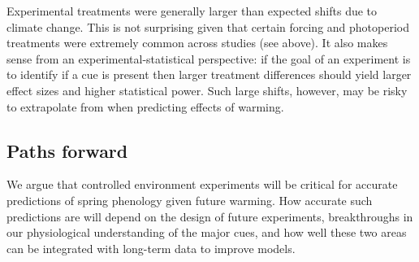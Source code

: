 \documentclass[11pt,letter]{article}
\begin{document}
Experimental treatments were generally larger than expected shifts due to climate change. This is not surprising given that certain forcing and photoperiod treatments were extremely common across studies (see above). It also makes sense from an experimental-statistical perspective: if the goal of an experiment is to identify if a cue is present then larger treatment differences should yield larger effect sizes and higher statistical power. Such large shifts, however, may be risky to extrapolate from when predicting effects of warming.   %

\subsection{Paths forward} 
We argue that controlled environment experiments will be critical for accurate predictions of spring phenology given future warming. How accurate such predictions are will depend on the design of future experiments, breakthroughs in our physiological understanding of the major cues, and how well these two areas can be integrated with long-term data to improve models. \\
\end{document}
